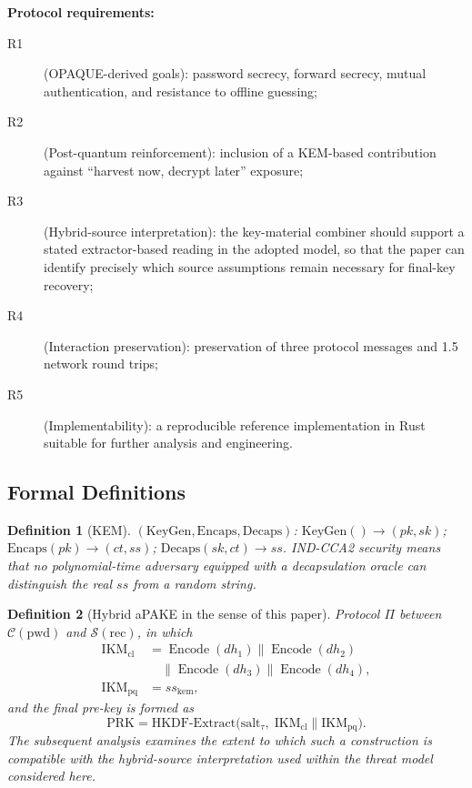 \documentclass[preprint,12pt]{elsarticle}
\newtheorem{definition}{Definition}[section]
\theoremstyle{remark}
\begin{document}
\textbf{Protocol requirements:}
\begin{description}
  \item[R1] (OPAQUE-derived goals): password secrecy, forward secrecy,
        mutual authentication, and resistance to offline guessing;
  \item[R2] (Post-quantum reinforcement): inclusion of a KEM-based
        contribution against ``harvest now, decrypt later'' exposure;
  \item[R3] (Hybrid-source interpretation): the key-material combiner
        should support a stated extractor-based reading in the adopted
        model, so that the paper can identify precisely which source
        assumptions remain necessary for final-key recovery;
  \item[R4] (Interaction preservation): preservation of three protocol
        messages and 1.5 network round trips;
  \item[R5] (Implementability): a reproducible reference implementation
        in Rust suitable for further analysis and engineering.
\end{description}

\subsection{Formal Definitions}

\begin{definition}[KEM]
$(\mathrm{KeyGen}, \mathrm{Encaps}, \mathrm{Decaps})$:
$\mathrm{KeyGen}() \to (pk, sk)$;
$\mathrm{Encaps}(pk) \to (ct, ss)$;
$\mathrm{Decaps}(sk, ct) \to ss$.
IND-CCA2 security means that no polynomial-time adversary equipped with
a decapsulation oracle can distinguish the real $ss$ from a random
string.
\end{definition}

\begin{definition}[Hybrid aPAKE in the sense of this paper]
Protocol $\Pi$ between $\mathcal{C}(\mathrm{pwd})$ and
$\mathcal{S}(\mathrm{rec})$, in which
\[
  \begin{aligned}
    \mathrm{IKM}_{\mathrm{cl}}
      &= \operatorname{Encode}(dh_1) \| \operatorname{Encode}(dh_2)\\
      &\quad \| \operatorname{Encode}(dh_3) \|
        \operatorname{Encode}(dh_4),\\
    \mathrm{IKM}_{\mathrm{pq}} &= ss_{\mathrm{kem}},
  \end{aligned}
\]
and the final pre-key is formed as
\[
  \mathrm{PRK} = \mathrm{HKDF\text{-}Extract}\!\bigl(
    \mathrm{salt}_{\tau},\;
    \mathrm{IKM}_{\mathrm{cl}} \| \mathrm{IKM}_{\mathrm{pq}}\bigr).
\]
The subsequent analysis examines the extent to which such a
construction is compatible with the hybrid-source interpretation used
within the threat model considered here.
\end{definition}
\end{document}

